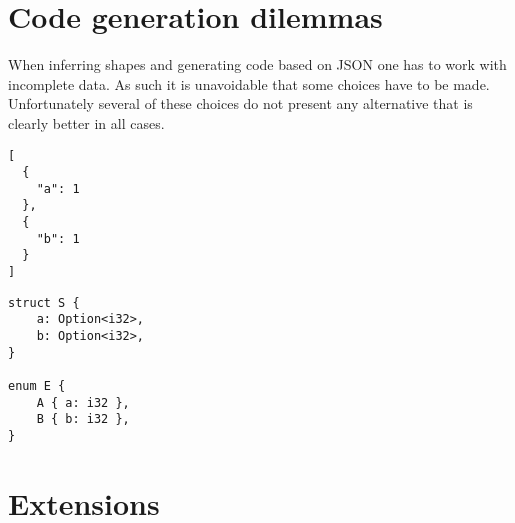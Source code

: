 \section{Code generation dilemmas}
\label{sec:design-considerations}

When inferring shapes and generating code based on JSON one has to work with incomplete data. As such it is unavoidable that some choices have to be made. Unfortunately several of these choices do not present any alternative that is clearly better in all cases.




\begin{listing}[ht!]
\begin{verbatim}
[
  {
    "a": 1
  },
  {
    "b": 1
  }
]
\end{verbatim}
\caption{JSON Dilemma \#1}
\label{lst:json-dilemma-1}
\end{listing}

\begin{listing}[ht!]
\begin{verbatim}
struct S {
    a: Option<i32>,
    b: Option<i32>,
}

enum E {
    A { a: i32 },
    B { b: i32 },
}
\end{verbatim}
\caption{JSON Dilemma \#1 - Two solutions}
\label{lst:json-dilemma-1-rs}
\end{listing}

\section{Extensions}




